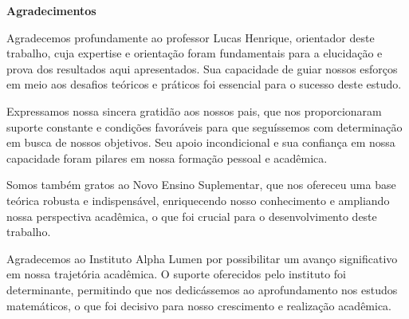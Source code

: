 \begin{center}
  \large \textbf{Agradecimentos}
\end{center}
\par Agradecemos profundamente ao professor Lucas Henrique, orientador deste trabalho, cuja expertise e orientação foram fundamentais para a elucidação e prova dos resultados aqui apresentados. Sua capacidade de guiar nossos esforços em meio aos desafios teóricos e práticos foi essencial para o sucesso deste estudo.

Expressamos nossa sincera gratidão aos nossos pais, que nos proporcionaram suporte constante e condições favoráveis para que seguíssemos com determinação em busca de nossos objetivos. Seu apoio incondicional e sua confiança em nossa capacidade foram pilares em nossa formação pessoal e acadêmica.

Somos também gratos ao Novo Ensino Suplementar, que nos ofereceu uma base teórica robusta e indispensável, enriquecendo nosso conhecimento e ampliando nossa perspectiva acadêmica, o que foi crucial para o desenvolvimento deste trabalho.

Agradecemos ao Instituto Alpha Lumen por possibilitar um avanço significativo em nossa trajetória acadêmica. O suporte oferecidos pelo instituto foi determinante, permitindo que nos dedicássemos ao aprofundamento nos estudos matemáticos, o que foi decisivo para nosso crescimento e realização acadêmica.

\newpage
